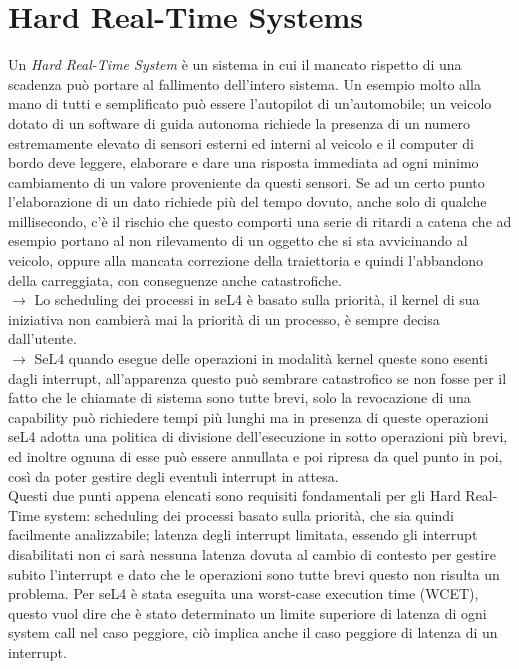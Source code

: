\section{Hard Real-Time Systems}
Un \textit{Hard Real-Time System} è un sistema in cui il mancato rispetto di una scadenza può portare al fallimento dell'intero sistema. Un esempio molto alla mano di tutti e semplificato può essere l'autopilot di un'automobile; un veicolo dotato di un software di guida autonoma richiede la presenza di un numero estremamente elevato di sensori esterni ed interni al veicolo e il computer di bordo deve leggere, elaborare e dare una risposta immediata ad ogni minimo cambiamento di un valore proveniente da questi sensori. Se ad un certo punto l'elaborazione di un dato richiede più del tempo dovuto, anche solo di qualche millisecondo, c'è il rischio che questo comporti una serie  di ritardi a catena che ad esempio portano al non rilevamento di un oggetto che si sta avvicinando al veicolo, oppure alla mancata correzione della traiettoria e quindi l'abbandono della carreggiata, con conseguenze anche catastrofiche.\\
$\rightarrow$ Lo scheduling dei processi in seL4 è basato sulla priorità, il kernel di sua iniziativa non cambierà mai la priorità di un processo, è sempre decisa dall'utente.\\
$\rightarrow$ SeL4 quando esegue delle operazioni in modalità kernel queste sono esenti dagli interrupt, all'apparenza questo può sembrare catastrofico se non fosse per il fatto che le chiamate di sistema sono tutte brevi, solo la revocazione di una capability può richiedere tempi più lunghi ma in presenza di queste operazioni seL4 adotta una politica di divisione dell'esecuzione in sotto operazioni più brevi, ed inoltre ognuna di esse può essere annullata e poi ripresa da quel punto in poi, così da poter gestire degli eventuli interrupt in attesa.\\
Questi due punti appena elencati sono requisiti fondamentali per gli Hard Real-Time system: scheduling dei processi basato sulla priorità, che sia quindi facilmente analizzabile; latenza degli interrupt limitata, essendo gli interrupt disabilitati non ci sarà nessuna latenza dovuta al cambio di contesto per gestire subito l'interrupt e dato che le operazioni sono tutte brevi questo non risulta un problema.
Per seL4 è stata eseguita una worst-case execution time (WCET), questo vuol dire che è stato determinato un limite superiore di latenza di ogni system call nel caso peggiore, ciò implica anche il caso peggiore di latenza di un interrupt.

